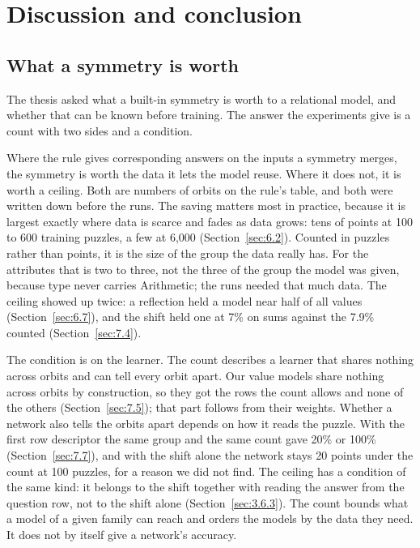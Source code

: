\chapter{Discussion and conclusion}\label{ch:8}

\section{What a symmetry is worth}\label{sec:8.1}

The thesis asked what a built-in symmetry is worth to a relational model, and whether that can be known before training. The answer the experiments give is a count with two sides and a condition.

Where the rule gives corresponding answers on the inputs a symmetry merges, the symmetry is worth the data it lets the model reuse. Where it does not, it is worth a ceiling. Both are numbers of orbits on the rule's table, and both were written down before the runs. The saving matters most in practice, because it is largest exactly where data is scarce and fades as data grows: tens of points at 100 to 600 training puzzles, a few at 6,000 (Section~\ref{sec:6.2}). Counted in puzzles rather than points, it is the size of the group the data really has. For the attributes that is two to three, not the three of the group the model was given, because type never carries Arithmetic; the runs needed that much data. The ceiling showed up twice: a reflection held a model near half of all values (Section~\ref{sec:6.7}), and the shift held one at 7\% on sums against the 7.9\% counted (Section~\ref{sec:7.4}).

The condition is on the learner. The count describes a learner that shares nothing across orbits and can tell every orbit apart. Our value models share nothing across orbits by construction, so they got the rows the count allows and none of the others (Section~\ref{sec:7.5}); that part follows from their weights. Whether a network also tells the orbits apart depends on how it reads the puzzle. With the first row descriptor the same group and the same count gave 20\% or 100\% (Section~\ref{sec:7.7}), and with the shift alone the network stays 20 points under the count at 100 puzzles, for a reason we did not find. The ceiling has a condition of the same kind: it belongs to the shift together with reading the answer from the question row, not to the shift alone (Section~\ref{sec:3.6.3}). The count bounds what a model of a given family can reach and orders the models by the data they need. It does not by itself give a network's accuracy.

